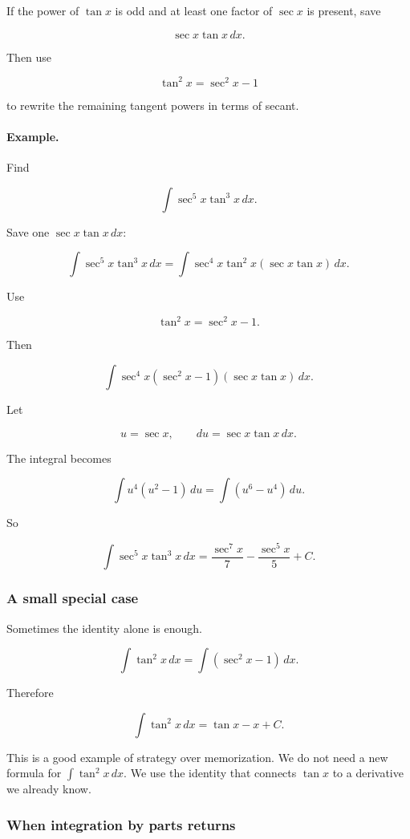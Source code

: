 If the power of \(\tan x\) is odd and at least one factor of \(\sec x\) is present, save

\[
\sec x\tan x\,dx.
\]

Then use

\[
\tan^2 x=\sec^2 x-1
\]

to rewrite the remaining tangent powers in terms of secant.

\paragraph{Example.}
Find

\[
\int \sec^5 x\tan^3 x\,dx.
\]

Save one \(\sec x\tan x\,dx\):

\[
\int \sec^5 x\tan^3 x\,dx
=
\int \sec^4 x\tan^2 x(\sec x\tan x)\,dx.
\]

Use

\[
\tan^2 x=\sec^2 x-1.
\]

Then

\[
\int \sec^4 x(\sec^2 x-1)(\sec x\tan x)\,dx.
\]

Let

\[
u=\sec x,
\qquad
du=\sec x\tan x\,dx.
\]

The integral becomes

\[
\int u^4(u^2-1)\,du
=
\int (u^6-u^4)\,du.
\]

So

\[
\boxed{
\int \sec^5 x\tan^3 x\,dx
=
\frac{\sec^7 x}{7}-\frac{\sec^5 x}{5}+C.
}
\]

\subsubsection*{A small special case}

Sometimes the identity alone is enough.

\[
\int \tan^2 x\,dx
=
\int(\sec^2 x-1)\,dx.
\]

Therefore

\[
\boxed{
\int \tan^2 x\,dx=\tan x-x+C.
}
\]

This is a good example of strategy over memorization.  We do not need a new formula
for \(\int \tan^2 x\,dx\).  We use the identity that connects \(\tan x\) to a derivative
we already know.

\subsubsection*{When integration by parts returns}

